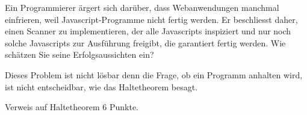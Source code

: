 Ein Programmierer ärgert sich darüber, dass Webanwendungen manchmal
einfrieren, weil Javascript-Programme nicht fertig werden.
Er beschliesst daher, einen Scanner zu implementieren, der alle
Java\-scripts inspiziert und nur noch solche Javascripts zur Ausführung
freigibt, die garantiert fertig werden. Wie schätzen Sie seine
Erfolgsaussichten ein?

\begin{loesung}
Dieses Problem ist nicht lösbar denn die Frage, ob ein Programm 
anhalten wird, ist nicht entscheidbar, wie das Haltetheorem besagt.
\end{loesung}

\begin{bewertung}
Verweis auf Haltetheorem 6 Punkte.
\end{bewertung}
